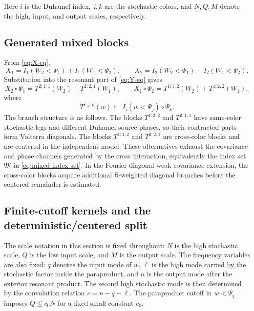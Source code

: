 \documentclass[10pt]{amsart}
\numberwithin{equation}{section}
\theoremstyle{plain}
\theoremstyle{definition}
\theoremstyle{remark}
\begin{document}
Here $i$ is the Duhamel index, $j,k$ are the stochastic colors, and $N,Q,M$ denote the high, input, and output scales, respectively.

\subsection{Generated mixed blocks}
From \eqref{eq:X-eq},
\begin{equation}\label{eq:X-formulas}
X_1=I_1(W_2<\Psi_1)+I_1(W_1<\Psi_2),
\qquad
X_2=I_2(W_2<\Psi_1)+I_2(W_1<\Psi_2).
\end{equation}
Substitution into the resonant part of \eqref{eq:Y-eq} gives
\begin{equation}\label{eq:generated-mixed-blocks}
X_2\circ\Psi_1=T^{2;1,1}(W_2)+T^{2;2,1}(W_1),
\qquad
X_1\circ\Psi_2=T^{1;1,2}(W_2)+T^{1;2,2}(W_1),
\end{equation}
where
\begin{equation}\label{eq:T-def}
T^{i;j,k}(w):=I_i(w<\Psi_j)\circ\Psi_k.
\end{equation}
The branch structure is as follows.  The blocks $T^{1;2,2}$ and $T^{2;1,1}$ have same-color stochastic legs and different Duhamel-source phases, so their contracted parts form Volterra diagonals.  The blocks $T^{1;1,2}$ and $T^{2;2,1}$ are cross-color blocks and are centered in the independent model.  These alternatives exhaust the covariance and phase channels generated by the cross interaction, equivalently the index set $\mathfrak M$ in \eqref{eq:mixed-index-set}.  In the Fourier-diagonal weak-covariance extension, the cross-color blocks acquire additional $\mathsf R$-weighted diagonal branches before the centered remainder is estimated.

\subsection{Finite-cutoff kernels and the deterministic/centered split}\label{subsec:finite-kernels}
The scale notation in this section is fixed throughout: $N$ is the high stochastic scale, $Q$ is the low input scale, and $M$ is the output scale.  The frequency variables are also fixed: $q$ denotes the input mode of $w$, $\ell$ is the high mode carried by the stochastic factor inside the paraproduct, and $n$ is the output mode after the exterior resonant product.  The second high stochastic mode is then determined by the convolution relation $r=n-q-\ell$.  The paraproduct cutoff in $w<\Psi_j$ imposes $Q\le c_0N$ for a fixed small constant $c_0$.
\end{document}
